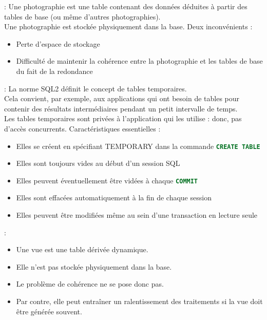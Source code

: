 \documentclass[10pt]{beamer}
\begin{document}
\begin{frame}{\secname : \subsecname}
    Une photographie est une table contenant des données déduites à partir des tables de base (ou même d'autres photographies).\\
    Une photographie est stockée physiquement dans la base.
    Deux inconvénients :
    \begin{itemize}
        \item Perte d'espace de stockage
        \item Difficulté de maintenir la cohérence entre la photographie et les tables de base du fait de la redondance
    \end{itemize}
\end{frame}

\begin{frame}{\secname : \subsecname}
    La norme SQL2 définit le concept de tables temporaires.\\
    Cela convient, par exemple, aux applications qui ont besoin de tables pour contenir des résultats intermédiaires pendant un petit intervalle de temps.\\
    Les tables temporaires sont privées à l'application qui les utilise : donc, pas d'accès concurrents.
    Caractéristiques essentielles :
    \begin{itemize}
        \item Elles se créent en spécifiant TEMPORARY dans la commande \lstinline[language=sql]!CREATE TABLE!
        \item Elles sont toujours vides au début d'un session SQL
        \item Elles peuvent éventuellement être vidées à chaque \lstinline[language=sql]!COMMIT!
        \item Elles sont effacées automatiquement à la fin de chaque session
        \item Elles peuvent être modifiées même au sein d'une transaction en lecture seule
    \end{itemize}
\end{frame}

\begin{frame}{\secname : \subsecname}
    \begin{itemize}
        \item Une vue est une table dérivée dynamique.
        \item Elle n'est pas stockée physiquement dans la base.
        \item Le problème de cohérence ne se pose donc pas.
        \item Par contre, elle peut entraîner un ralentissement des traitements si la vue doit être générée souvent.
    \end{itemize}
\end{frame}
\end{document}
